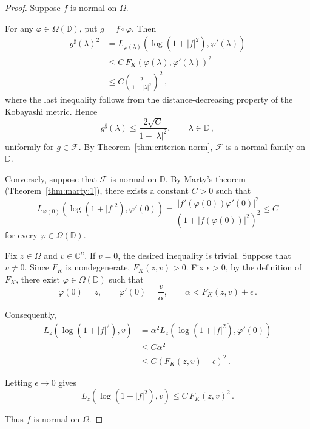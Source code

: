 \documentclass[pdflatex]{sn-jnl}%
\theoremstyle{definition}
\theoremstyle{remark}
\numberwithin{equation}{section}
\newcommand{\C}{\mathbb{C}}
\newcommand{\D}{\mathbb{D}}
\begin{document}
    \begin{proof}
        Suppose $f$ is normal on $\Omega$.

        For any $\varphi\in\Omega(\D)$, put $g=f\circ\varphi$.
        Then
        \[
            \begin{aligned}
                g^\sharp(\lambda)^2 & = L_{\varphi(\lambda)}\left(\log(1+|f|^2),\varphi'(\lambda)\right) \\
                                        & \leq C\,F_K(\varphi(\lambda),\varphi'(\lambda))^2                \\
                                        & \leq C\left( \frac{2}{1-|\lambda|^2}\right)^2\,,
            \end{aligned}
        \]
        where the last inequality follows from the distance-decreasing property of the Kobayashi metric.
        Hence
        \[
            g^\sharp(\lambda) \leq \frac{2\sqrt{C}}{1-|\lambda|^2}, \qquad \lambda\in\D\,,
        \]
        uniformly for $g\in\mathcal{F}$.
        By Theorem~\ref{thm:criterion-norm}, $\mathcal{F}$ is a normal family on $\D$.

        Conversely, suppose that $\mathcal{F}$ is normal on $\D$.
        By Marty's theorem (Theorem~\ref{thm:marty:1}), there exists a constant $C>0$ such that
        \[
            L_{\varphi(0)}\left( \log(1+|f|^2),\varphi'(0) \right) = \frac{ |f'(\varphi(0))\varphi'(0)|^2 }{ (1+|f(\varphi(0))|^2)^2 }\leq C
        \]
        for every $\varphi\in\Omega(\D)$.

        Fix $z\in\Omega$ and $v\in\C^n$.
        If $v=0$, the desired inequality is trivial.
        Suppose that $v\neq0$.
        Since $F_K$ is nondegenerate, $F_K(z,v)>0$.
        Fix $\epsilon>0$, by the definition of $F_K$, there exist $\varphi\in\Omega(\D)$ such that
        \[
            \varphi(0)=z,\qquad \varphi'(0)=\frac{v}{\alpha}, \qquad \alpha<F_K(z,v)+\epsilon\,.
        \]

        Consequently,
        \[
            \begin{aligned}
                L_z\left(\log(1+|f|^2),v\right) & = \alpha^2 L_z\left( \log(1+|f|^2),\varphi'(0) \right) \\
                                                    & \leq C\alpha^2                                             \\
                                                    & \leq C(F_K(z,v)+\epsilon)^2\,.
            \end{aligned}
        \]

        Letting $\epsilon\to 0$ gives
        \[
            L_z\left(\log(1+|f|^2),v\right) \leq C\,F_K(z,v)^2\,.
        \]

        Thus $f$ is normal on $\Omega$.
    \end{proof}
\end{document}
